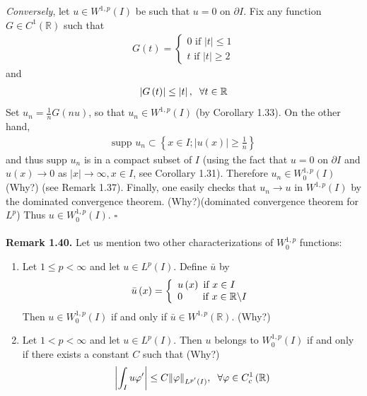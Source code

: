 \documentclass[a4paper,oneside]{book}
\numberwithin{equation}{chapter}
\begin{document}
\textit{Conversely}, let $u\in W^{1,p}\left(I\right)$ be such that $u=0$ on $\partial I$. Fix any function $G\in C^1\left(\mathbb{R}\right)$ such that
\begin{align}
G\left( t \right) = \left\{ {\begin{array}{*{20}{c}}
{0\mbox{ if } \left| t \right| \le 1}\\
{t\mbox{ if } \left| t \right| \ge 2}
\end{array}} \right.
\end{align}
and
\begin{align}
\left| {G\left( t \right)} \right| \le \left| t \right|,\hspace{0.2cm}\forall t \in \mathbb{R}
\end{align}
Set ${u_n} = \frac{1}{n}G\left( {nu} \right)$, so that $u_n\in W^{1,p}\left(I\right)$ (by Corollary 1.33). On the other hand,
\begin{align}
\mbox{supp }{u_n} \subset \left\{ {x \in I;\left| {u\left( x \right)} \right| \ge \frac{1}{n}} \right\}
\end{align}
and thus $\mbox{supp }u_n$ is in a compact subset of $I$ (using the fact that $u=0$ on $\partial I$ and $u\left(x\right)\to 0$ as $\left| x \right| \to \infty ,x \in I$, see Corollary 1.31). Therefore $u_n\in W_0^{1,p}\left(I\right)$ (Why?) (see Remark 1.37). Finally, one easily checks that $u_n\to u$ in $W^{1,p}\left(I\right)$ by the dominated convergence theorem.  (Why?)(dominated convergence theorem for $L^p$) Thus $u\in W_0^{1,p}\left(I\right)$. \hfill $\square$\\
\\
\textbf{Remark 1.40.} Let us mention two other characterizations of $W_0^{1,p}$ functions:
\begin{enumerate}
\item Let $1\le p<\infty$ and let $u\in L^p\left(I\right)$. Define $\bar{u}$ by
\begin{align}
\bar u\left( x \right) = \left\{ {\begin{array}{*{20}{l}}
{u\left( x \right)\mbox{ if } x \in I}\\
{0\hspace{0.6cm}\mbox{ if } x \in \mathbb{R} \backslash I}
\end{array}} \right.
\end{align}
Then $u\in W_0^{1,p}\left(I\right)$ if and only if $\bar u \in W^{1,p}\left(\mathbb{R}\right)$. (Why?)
\item Let $1<p<\infty$ and let $u\in L^p\left(I\right)$. Then $u$ belongs to $W_0^{1,p}\left(I\right)$ if and only if there exists a constant $C$ such that (Why?)
\begin{align}
\left| {\int_I {u\varphi '} } \right| \le C{\left\| \varphi  \right\|_{{L^{p'}}\left( I \right)}},\hspace{0.2cm}\forall \varphi  \in C_c^1\left( \mathbb{R} \right)
\end{align}
\end{enumerate}
\end{document}
